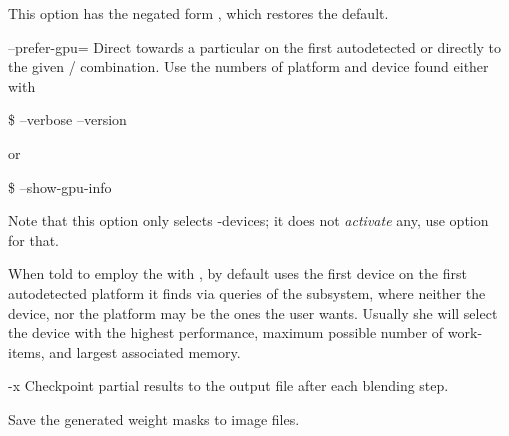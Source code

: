 \begin{codelist}
    This option has the negated form
    ,
    which restores the default.
\fi


  \label{opt:prefer-gpu}%
\item[--prefer-gpu=\optional{\metavar{PLATFORM}:}\metavar{DEVICE}
  \restrictednote{\acronym{OpenCL}-enabled versions only.}]\itemend
  Direct \App{} towards a particular 
   on the first autodetected
   or directly to the given
  \slash{} combination.  Use the
  numbers of platform and device found either with
  \begin{terminal}
    \$ \app{} --verbose --version
  \end{terminal}
  or
  \begin{terminal}
    \$ \app{} --show-gpu-info
  \end{terminal}
  Note that this option only selects -devices; it does
  not \emph{activate} any, use
  option~ for that.

  When told to employ the  with
  , by default \App{} uses the first device on the first
  autodetected platform it finds via queries of the
   subsystem, where neither the device,
  nor the platform may be the ones the user wants.  Usually she will
  select the device with the highest performance, maximum possible
  number of work-items, and largest associated memory.


\ifenblend
  \label{opt:x}%
  \item[-x] Checkpoint
     partial results to the output file
    after each blending step.
\fi


\ifenfuse
  \label{opt:save-masks}%
  \item[\itempar{--save-masks~\textrm{(\oldstylefirst~form)}
      \\ --save-masks=\metavar{SOFT-MASK-TEMPLATE}~\textrm{(\oldstylesecond~form)}
      \\ --save-masks=\metavar{SOFT-MASK-TEMPLATE}:\feasiblebreak
      \metavar{HARD-MASK-TEMPLATE}~\textrm{(\oldstylethird~form)}}]\itemend
    Save the generated weight
    masks to image files.


\end{codelist}
